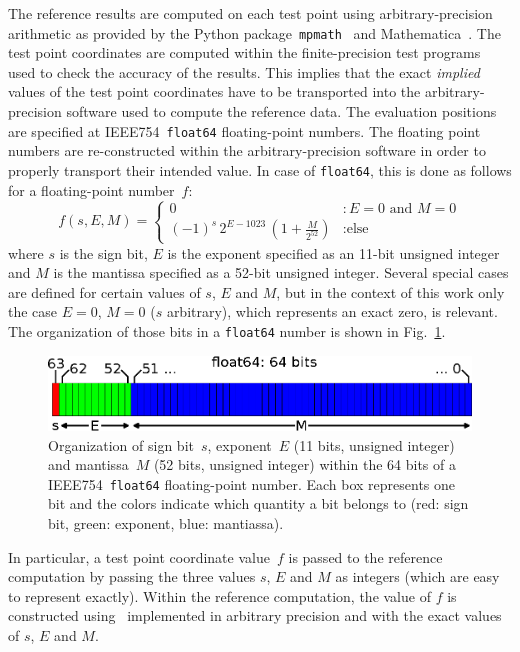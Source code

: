 The reference results are computed on each test point using arbitrary-precision arithmetic
as provided by the Python package~\texttt{mpmath}~\cite{mpmath} and Mathematica~\cite{Mathematica}.
The test point coordinates are computed within the finite-precision test programs used to check the accuracy of the results.
This implies that the exact \textit{implied} values of the test point coordinates have to be transported
into the arbitrary-precision software used to compute the reference data.
The evaluation positions are specified at IEEE754~\texttt{float64} floating-point numbers.
The floating point numbers are re-constructed within the arbitrary-precision software
in order to properly transport their intended value.
In case of \texttt{float64}, this is done as follows for a floating-point number~$f$:
\begin{equation}
 f(s, E, M) =
 \begin{cases}
   0                                                             &: E=0 \textrm{ and } M=0 \\
   (-1)^s \, 2^{E - 1023} \, \left( 1 + \frac{M}{2^{52}} \right) &: \textrm{else}
  \end{cases} \label{eqn:float64}
\end{equation}
where $s$ is the sign bit, $E$ is the exponent specified as an 11-bit unsigned integer
and $M$ is the mantissa specified as a 52-bit unsigned integer.
Several special cases are defined for certain values of $s$, $E$ and $M$,
but in the context of this work only the case $E=0$, $M=0$ ($s$ arbitrary),
which represents an exact zero, is relevant.
The organization of those bits in a \texttt{float64} number is shown in Fig.~\ref{fig:float64}.
\begin{figure}[htbp]
 \centering
 \includegraphics{img/IEEE754_float64.eps}
 \caption{Organization of sign bit~$s$, exponent~$E$ (11 bits, unsigned integer)
          and mantissa~$M$ (52 bits, unsigned integer) within the 64 bits
          of a IEEE754~\texttt{float64} floating-point number.
          Each box represents one bit and the colors indicate which quantity a bit belongs to
          (red: sign bit, green: exponent, blue: mantiassa).}
 \label{fig:float64}
\end{figure}
In particular, a test point coordinate value~$f$ is passed to the reference computation
by passing the three values $s$, $E$ and $M$ as integers (which are easy to represent exactly).
Within the reference computation, the value of $f$ is constructed using~ implemented
in arbitrary precision and with the exact values of $s$, $E$ and $M$.


